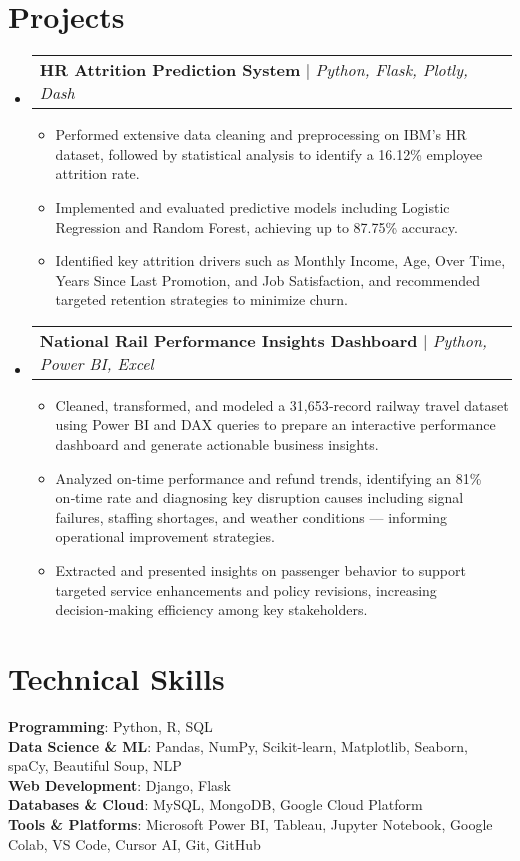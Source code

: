 \documentclass[letterpaper,11pt]{article}
\makeatletter
\newcommand{\resumeItem}[1]{
  \item\small{
    {#1 \vspace{-2pt}}
  }
}
\newcommand{\resumeProjectHeading}[2]{
    \item
    \begin{tabular*}{0.97\textwidth}{l@{\extracolsep{\fill}}r}
      \small#1 & #2 \\
    \end{tabular*}\vspace{-7pt}
}
\newcommand{\resumeSubHeadingListStart}{\begin{itemize}[leftmargin=0.15in, label={}]}
\newcommand{\resumeSubHeadingListEnd}{\end{itemize}}
\newcommand{\resumeItemListStart}{\begin{itemize}}
\newcommand{\resumeItemListEnd}{\end{itemize}\vspace{-5pt}}
\makeatother
\begin{document}
\section{Projects}
  \resumeSubHeadingListStart
    \resumeProjectHeading
        {\textbf{HR Attrition Prediction System} $|$ \emph{Python, Flask, Plotly, Dash}}{\href{https://github.com/Sudeep1911/Hr-attrition-analysis}{\faGithub}}
        \resumeItemListStart
          \resumeItem{Performed extensive data cleaning and preprocessing on IBM’s HR dataset, followed by statistical analysis to identify a 16.12\% employee attrition rate.}
          \resumeItem{Implemented and evaluated predictive models including Logistic Regression and Random Forest, achieving up to 87.75\% accuracy.}
          \resumeItem{Identified key attrition drivers such as Monthly Income, Age, Over Time, Years Since Last Promotion, and Job Satisfaction, and recommended targeted retention strategies to minimize churn.}
        \resumeItemListEnd

    \resumeProjectHeading
        {\textbf{National Rail Performance Insights Dashboard} $|$ \emph{Python, Power BI, Excel}}{\href{https://github.com/01Vishwa/Maven_Rail_Challenge}{\faGithub}}
        \resumeItemListStart
          \resumeItem{Cleaned, transformed, and modeled a 31,653‑record railway travel dataset using Power BI and DAX queries to prepare an interactive performance dashboard and generate actionable business insights.}
          \resumeItem{Analyzed on‑time performance and refund trends, identifying an 81\% on‑time rate and diagnosing key disruption causes including signal failures, staffing shortages, and weather conditions — informing operational improvement strategies.}
          \resumeItem{Extracted and presented insights on passenger behavior to support targeted service enhancements and policy revisions, increasing decision‑making efficiency among key stakeholders.}
        \resumeItemListEnd
  \resumeSubHeadingListEnd

\section{Technical Skills}
 \begin{itemize}[leftmargin=0.15in, label={}]
    \small{\item{
     \textbf{Programming}{: Python, R, SQL} \\
     \textbf{Data Science \& ML}{: Pandas, NumPy, Scikit-learn, Matplotlib, Seaborn, spaCy, Beautiful Soup, NLP} \\
     \textbf{Web Development}{: Django, Flask} \\
     \textbf{Databases \& Cloud}{:  MySQL, MongoDB, Google Cloud Platform} \\
     \textbf{Tools \& Platforms}{: Microsoft Power BI, Tableau, Jupyter Notebook, Google Colab, VS Code, Cursor AI, Git, GitHub} \\
    }}
 \end{itemize}
\end{document}

